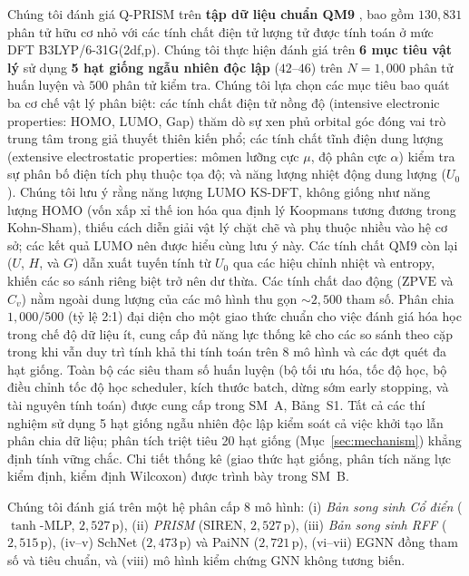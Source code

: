 \documentclass[10pt,twocolumn,letterpaper]{article}
\begin{document}
Chúng tôi đánh giá Q-PRISM trên \textbf{tập dữ liệu chuẩn QM9} \cite{ramakrishnan2014quantum}, bao gồm $130{,}831$ phân tử hữu cơ nhỏ với các tính chất điện tử lượng tử được tính toán ở mức DFT B3LYP/6-31G(2df,p).
Chúng tôi thực hiện đánh giá trên \textbf{6 mục tiêu vật lý} sử dụng \textbf{5 hạt giống ngẫu nhiên độc lập} ($42$--$46$) trên $N = 1{,}000$ phân tử huấn luyện và $500$ phân tử kiểm tra.
Chúng tôi lựa chọn các mục tiêu bao quát ba cơ chế vật lý phân biệt: các tính chất điện tử nồng độ (intensive electronic properties: HOMO, LUMO, Gap) thăm dò sự xen phủ orbital góc đóng vai trò trung tâm trong giả thuyết thiên kiến phổ; các tính chất tĩnh điện dung lượng (extensive electrostatic properties: mômen lưỡng cực $\mu$, độ phân cực $\alpha$) kiểm tra sự phân bố điện tích phụ thuộc tọa độ; và năng lượng nhiệt động dung lượng ($U_0$). Chúng tôi lưu ý rằng năng lượng LUMO KS-DFT, không giống như năng lượng HOMO (vốn xấp xỉ thế ion hóa qua định lý Koopmans tương đương trong Kohn-Sham), thiếu cách diễn giải vật lý chặt chẽ và phụ thuộc nhiều vào hệ cơ sở; các kết quả LUMO nên được hiểu cùng lưu ý này. Các tính chất QM9 còn lại ($U$, $H$, và $G$) dẫn xuất tuyến tính từ $U_0$ qua các hiệu chỉnh nhiệt và entropy, khiến các so sánh riêng biệt trở nên dư thừa. Các tính chất dao động ($\text{ZPVE}$ và $C_v$) nằm ngoài dung lượng của các mô hình thu gọn $\sim 2{,}500$ tham số.
Phân chia $1{,}000 / 500$ (tỷ lệ 2:1) đại diện cho một giao thức chuẩn cho việc đánh giá hóa học trong chế độ dữ liệu ít, cung cấp đủ năng lực thống kê cho các so sánh theo cặp trong khi vẫn duy trì tính khả thi tính toán trên 8 mô hình và các đợt quét đa hạt giống.
Toàn bộ các siêu tham số huấn luyện (bộ tối ưu hóa, tốc độ học, bộ điều chỉnh tốc độ học scheduler, kích thước batch, dừng sớm early stopping, và tài nguyên tính toán) được cung cấp trong SM~A, Bảng~S1.
Tất cả các thí nghiệm sử dụng 5 hạt giống ngẫu nhiên độc lập kiểm soát cả việc khởi tạo lẫn phân chia dữ liệu; phân tích triệt tiêu 20 hạt giống (Mục~\ref{sec:mechanism}) khẳng định tính vững chắc. Chi tiết thống kê (giao thức hạt giống, phân tích năng lực kiểm định, kiểm định Wilcoxon) được trình bày trong SM~B.

Chúng tôi đánh giá trên một hệ phân cấp 8 mô hình: (i) \textit{Bản song sinh Cổ điển} ($\tanh$-MLP, $2{,}527$\,p), (ii) \textit{PRISM} (SIREN, $2{,}527$\,p), (iii) \textit{Bản song sinh RFF} ($2{,}515$\,p), (iv--v) SchNet ($2{,}473$\,p) và PaiNN ($2{,}721$\,p), (vi--vii) EGNN đồng tham số và tiêu chuẩn, và (viii) mô hình kiểm chứng GNN không tương biến.
\end{document}
